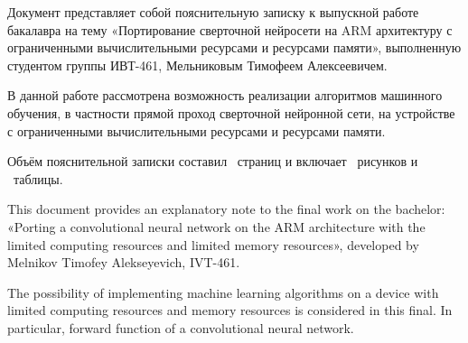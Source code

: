 \documentclass[a4paper,english,russian]{G2-105}
\begin{document}
\VSTUSetFacilityExpert{}{}{}{}
\VSTUInitializePZ
{}
\par Документ представляет собой пояснительную записку к выпускной работе бакалавра на тему «Портирование сверточной нейросети на ARM архитектуру с ограниченными вычислительными ресурсами и ресурсами памяти», выполненную студентом группы ИВТ-461, Мельниковым Тимофеем Алексеевичем.
\par В данной работе рассмотрена возможность реализации алгоритмов машинного обучения, в частности прямой проход сверточной нейронной сети, на устройстве с ограниченными вычислительными ресурсами и ресурсами памяти.
\par Объём пояснительной записки составил \totalpages~страниц и включает \totalfigures~рисунков и \totaltables~таблицы. 
\newpage

 \ttl
\par This document provides an explanatory note to the final work on the bachelor: «Porting a convolutional neural network on the ARM architecture with the limited computing resources and limited memory resources», developed by Melnikov Timofey Alekseyevich, IVT-461.
\par The possibility of implementing machine learning algorithms on a device with limited computing resources and memory resources is considered in this final. In particular,  forward function of a convolutional neural network.

\tableofcontents
\newpage
\end{document}

